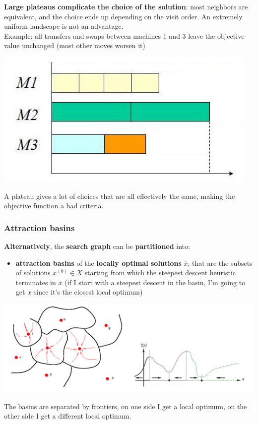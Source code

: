 \textbf{Large plateaus complicate the choice of the solution}: most neighbors are equivalent, and the choice ends up depending on the visit order. An extremely uniform landscape is not an advantage.\\

Example: all transfers and swaps between machines 1 and 3 leave the objective value unchanged (most other moves worsen it)
\begin{center}
	\includegraphics[width=0.55\columnwidth]{img/plateau2}
\end{center}

A plateau gives a lot of choices that are all effectively the same, making the objective function a bad criteria.\\

\newpage

\subsubsection{Attraction basins}
\textbf{Alternatively}, the \textbf{search graph} can be \textbf{partitioned} into:
\begin{itemize}
	\item \textbf{attraction basins} of the \textbf{locally optimal solutions} $\overline{x}$, that are the subsets of solutions $x^{(0)} \in X$ starting from which the steepest descent heuristic terminates in $\overline{x}$ (if I start with a steepest descent in the basin, I'm going to get $x$ since it's the closest local optimum)
\end{itemize}
\begin{center}
	\includegraphics[width=\columnwidth]{img/basins}
\end{center}
The basins are separated by frontiers, on one side I get a local optimum, on the other side I get a different local optimum.\\ 

